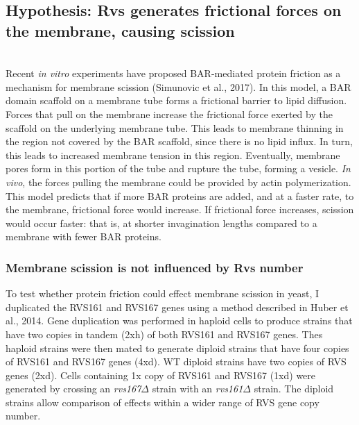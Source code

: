	\vspace{5mm}




\newpage

\subsection{Hypothesis: Rvs generates frictional forces on the membrane, causing scission}
				\mbox{}\\
Recent \textit{in vitro} experiments have proposed BAR-mediated protein friction as a mechanism for membrane scission (Simunovic et al., 2017). In this model, a BAR domain scaffold on a membrane tube forms a frictional barrier to lipid diffusion. Forces that pull on the membrane increase the frictional force exerted by the scaffold on the underlying membrane tube. This leads to membrane thinning in the region not covered by the BAR scaffold, since there is no lipid influx. In turn, this leads to increased membrane tension in this region. Eventually, membrane pores form in this portion of the tube and rupture the tube, forming a vesicle. \textit{In vivo}, the forces pulling the membrane could be provided by actin polymerization.
This model predicts that if more BAR proteins are added, and at a faster rate, to the membrane, frictional force would increase. If frictional force increases, scission would occur faster: that is, at shorter invagination lengths compared to a membrane with fewer BAR proteins. 


	\subsubsection{Membrane scission is not influenced by Rvs number}
To test whether protein friction could effect membrane scission in yeast, I duplicated the RVS161 and RVS167 genes using a method described in Huber et al., 2014. Gene duplication was performed in haploid cells to produce strains that have two copies in tandem (2xh) of both RVS161 and RVS167 genes. Thes haploid strains were then mated to generate diploid strains that have four copies of RVS161 and RVS167 genes (4xd). WT diploid strains have two copies of RVS genes (2xd). Cells containing 1x copy of RVS161 and RVS167 (1xd) were generated by crossing an \textit{rvs167$\Delta$}
 strain with an \textit{rvs161$\Delta$} strain. The diploid strains allow comparison of effects within a wider range of RVS gene copy number. 



	



